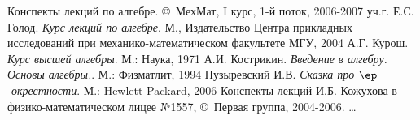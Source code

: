  \begin{thebibliography}{books}
    Конспекты лекций по алгебре. \copyright\, МехМат, I курс, 1-й поток, 2006-2007 уч.г.
    Е.С. Голод. \emph{Курс лекций по алгебре}. М., Издательство Центра прикладных исследований при механико-математическом факультете МГУ, 2004
    А.Г. Курош. \emph{Курс высшей алгебры}. М.: Наука, 1971
    А.И. Кострикин. \emph{Введение в алгебру. Основы алгебры.}. М.: Физматлит, 1994
    Пузыревский И.В. \emph{Сказка про $\ep$-окрестности}. М.: Hewlett-Packard, 2006
    Конспекты лекций И.Б. Кожухова в физико-математическом лицее №1557, \copyright\, Первая группа, 2004-2006.
   \dots

 \end{thebibliography}

